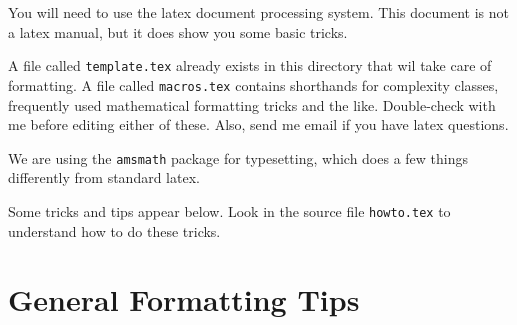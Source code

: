 



You will need to use the latex document processing system.
This document is not a latex manual, but it does show you some basic tricks.

A file called {\tt template.tex}
 already exists in this directory that wil take care
of formatting. A file called {\tt macros.tex} contains shorthands for 
complexity classes, frequently used mathematical formatting tricks and the like.
Double-check with me before editing either of these. Also, send me email if you
have latex questions. 

We are using the {\tt amsmath} package for typesetting, which does a few
things differently from standard latex.

Some tricks and tips appear below.
Look in the source file {\tt howto.tex} to understand how
to do these tricks.

\section{General Formatting Tips}

